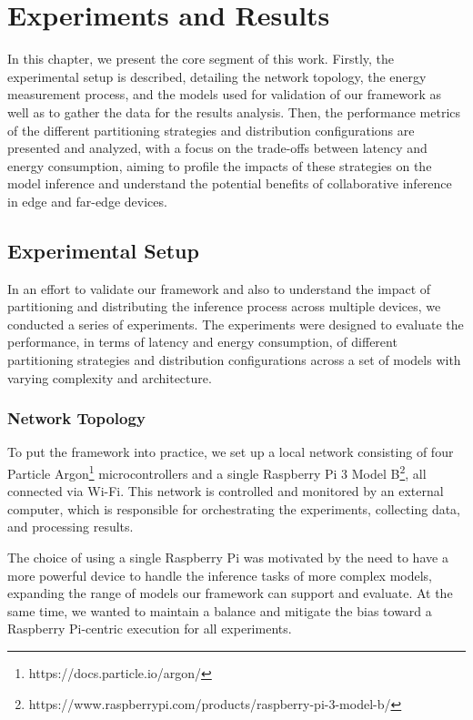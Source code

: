 \chapter {Experiments and Results} \label{chap:ch5}

In this chapter, we present the core segment of this work. Firstly, the experimental
setup is described, detailing the network topology, the energy measurement process, 
and the models used for validation of our framework as well as to gather the data for
the results analysis. Then, the performance metrics of the different partitioning
strategies and distribution configurations are presented and analyzed, with a focus on
the trade-offs between latency and energy consumption, aiming to profile the
impacts of these strategies on the model inference and understand the potential
benefits of collaborative inference in edge and far-edge devices.

\section {Experimental Setup} \label{sec:se51}

In an effort to validate our framework and also to understand the impact of
partitioning and distributing the inference process across multiple devices, we
conducted a series of experiments. The experiments were designed to evaluate the
performance, in terms of latency and energy consumption, of different partitioning
strategies and distribution configurations across a set of models with varying
complexity and architecture.

\subsection {Network Topology} \label{sec:se511}

To put the framework into practice, we set up a local network consisting of four
Particle Argon\footnote{https://docs.particle.io/argon/} microcontrollers and a
single Raspberry Pi 3 Model B\footnote{https://www.raspberrypi.com/products/raspberry-pi-3-model-b/},
all connected via Wi-Fi. This network is controlled and monitored by an external
computer, which is responsible for orchestrating the experiments, collecting data, 
and processing results.

The choice of using a single Raspberry Pi was motivated by the need to have a more
powerful device to handle the inference tasks of more complex models, expanding the
range of models our framework can support and evaluate. At the same time, we wanted
to maintain a balance and mitigate the bias toward a Raspberry Pi-centric execution
for all experiments. 

